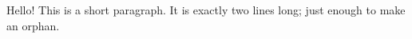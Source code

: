 \documentclass{article}
\begin{document}

Hello! This is a short paragraph. It is exactly two lines long; just enough to make an orphan.













\end{document}
